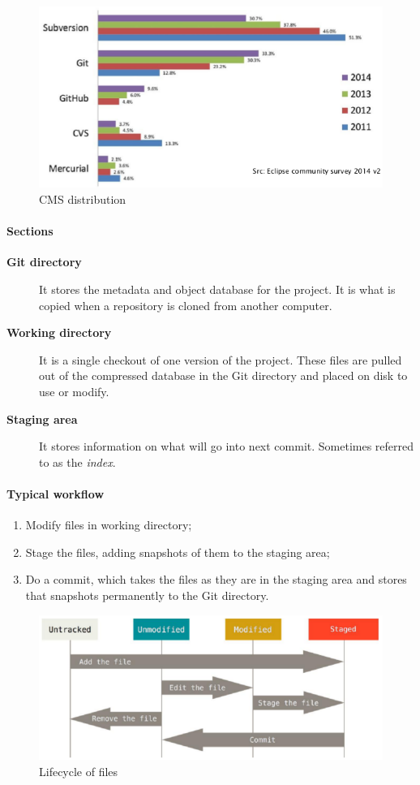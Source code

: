 \begin{figure}[hbtp]
\centering
\includegraphics[scale=0.4]{images/cms_distribution.png}
\caption{CMS distribution}
\end{figure}

\paragraph{Sections}
\begin{description}
\item [\textbf{Git directory}] It stores the metadata and object database for the project. It is what is copied when a repository is cloned from another computer.
\item [\textbf{Working directory}] It is a single checkout of one version of the project. These files are pulled out of the compressed database in the Git directory and placed on disk to use or modify.
\item [\textbf{Staging area}] It stores information on what will go into next commit. Sometimes referred to as the \emph{index}.
\end{description}

\paragraph{Typical workflow}
\begin{enumerate}
\item Modify files in working directory;
\item Stage the files, adding snapshots of them to the staging area;
\item Do a commit, which takes the files as they are in the staging area and stores that snapshots permanently to the Git directory.
\end{enumerate}

\begin{figure}[hbtp]
\centering
\includegraphics[scale=0.4]{images/file_lifecycle.png}
\caption{Lifecycle of files}
\end{figure}

